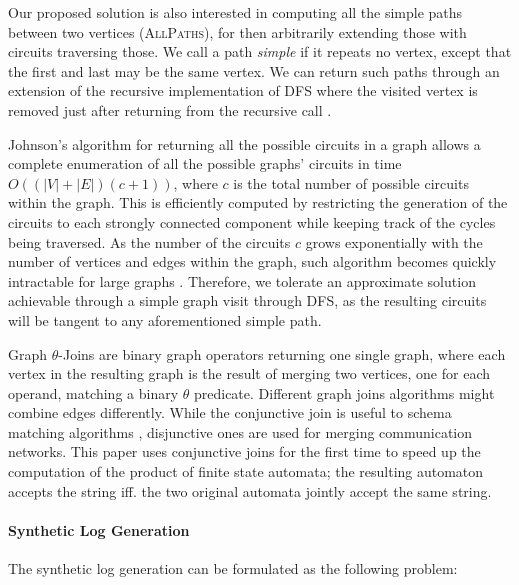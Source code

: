 \documentclass[acmengage]{acmart}
\begin{document}
Our proposed solution is also interested in computing all the simple paths between two vertices (\textsc{AllPaths}), for then arbitrarily extending those with circuits traversing those. We call a path \textit{simple} if it repeats no vertex, except that the first and last may be the same vertex. We can return such paths through an extension of the recursive implementation of DFS where the visited vertex is removed just after returning from the recursive call \cite{ASPNIST}. 


Johnson's algorithm for returning all the possible circuits in a graph \cite{doi:10.1137/0204007} allows a complete enumeration of all the possible graphs' circuits in time $O((|V|+|E|)(c+1))$, where $c$ is the total number of possible circuits within the graph. This is efficiently computed by restricting the generation of the circuits to each strongly connected component  while keeping track of the cycles being traversed. As the number of the circuits $c$ grows exponentially with the number of vertices and edges within the graph, such algorithm becomes quickly intractable for large graphs \cite{DBLP:conf/fcs/HawickJ08}. Therefore, we tolerate an approximate solution achievable through a simple graph visit through DFS, as the resulting circuits will be tangent to any aforementioned simple path. 

Graph $\theta$-Joins \cite{DBLP:conf/ideas/Bergami21} are binary graph  operators returning one single graph, where each vertex in the resulting graph is the result of merging two vertices, one for each operand, matching a binary $\theta$ predicate. Different graph joins algorithms might combine edges differently. While the conjunctive join is useful to schema matching algorithms \cite{DBLP:books/sp/Melnik04}, disjunctive ones are used for merging communication networks. This paper uses conjunctive joins for the first time to speed up the computation of the product of finite state automata; the resulting automaton accepts the string iff. the two original automata jointly accept the same string. %



\paragraph*{Synthetic Log Generation} The synthetic log generation can be formulated as the following problem: 
\end{document}
